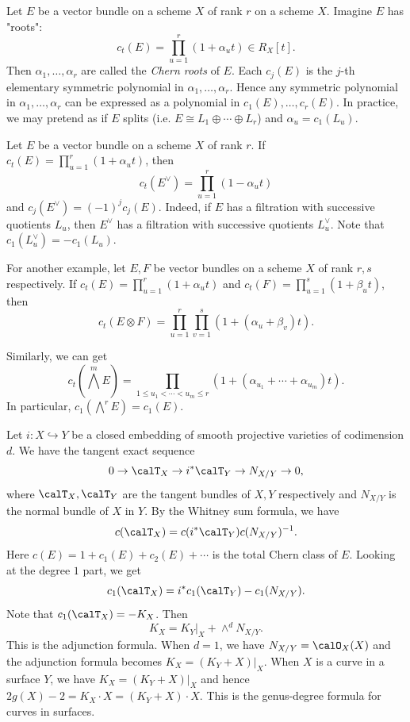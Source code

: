  Let $E$ be a vector bundle on a scheme $X$ of rank $r$ on a scheme $X$.
  Imagine $E$ has "roots":
  \[ c_t(E) = \prod_{u=1}^r (1 + \alpha_u t) \in R_X [t]. \]
  Then $\alpha_1, \dots, \alpha_r$ are called the \emph{Chern roots} of $E$.
  Each $c_j(E)$ is the $j$-th elementary symmetric polynomial in $\alpha_1, \dots, \alpha_r$.
  Hence any symmetric polynomial in $\alpha_1, \dots, \alpha_r$ can be expressed as a polynomial in $c_1(E), \dots, c_r(E)$.
  In practice, we may pretend as if $E$ splits (i.e. $E \cong L_1 \oplus \cdots \oplus L_r$) and $\alpha_u = c_1(L_u)$.

  \begin{example}
    Let $E$ be a vector bundle on a scheme $X$ of rank $r$.
    If $c_t(E) = \prod_{u=1}^r (1 + \alpha_u t)$, then 
    \[ c_t(E^\vee) = \prod_{u=1}^r (1 - \alpha_u t) \]
    and $c_j(E^\vee) = (-1)^j c_j(E)$.
    Indeed, if $E$ has a filtration with successive quotients $L_u$, then $E^\vee$ has a filtration with successive quotients $L_u^\vee$.
    Note that $c_1(L_u^\vee) = - c_1(L_u)$.

    For another example, let $E, F$ be vector bundles on a scheme $X$ of rank $r, s$ respectively.
    If $c_t(E) = \prod_{u=1}^r (1 + \alpha_u t)$ and $c_t(F) = \prod_{u=1}^{s} (1 + \beta_u t)$, then
    \[ c_t(E \otimes F) = \prod_{u=1}^r \prod_{v=1}^s (1 + (\alpha_u + \beta_v) t). \]

    Similarly, we can get
    \[ c_t(\bigwedge^m E) = \prod_{1 \leq u_1 < \cdots < u_m \leq r} (1 + (\alpha_{u_1} + \cdots + \alpha_{u_m}) t). \]
    In particular, $c_1(\bigwedge^r E) = c_1(E)$.
  \end{example}

  \begin{example}
    Let $i: X \hookrightarrow Y$ be a closed embedding of smooth projective varieties of codimension $d$.
    We have the tangent exact sequence
    \[ 0 \to \calT_X \to i^* \calT_Y \to N_{X/Y} \to 0, \]
    where $\calT_X, \calT_Y$ are the tangent bundles of $X, Y$ respectively and $N_{X/Y}$ is the normal bundle of $X$ in $Y$.
    By the Whitney sum formula, we have
    \[ c(\calT_X) = c(i^* \calT_Y) c(N_{X/Y})^{-1}. \]
    Here $c(E) = 1 + c_1(E) + c_2(E) + \cdots$ is the total Chern class of $E$.
    Looking at the degree $1$ part, we get
    \[ c_1(\calT_X) = i^* c_1(\calT_Y) - c_1(N_{X/Y}). \]
    Note that $c_1(\calT_X) = - K_X$.
    Then 
    \[ K_X = K_Y|_X + \wedge^d N_{X/Y}. \]
    This is the adjunction formula.
    When $d = 1$, we have $N_{X/Y} = \calO_X(X)$ and the adjunction formula becomes $K_X = (K_Y + X)|_X$.
    When $X$ is a curve in a surface $Y$, we have $K_X = (K_Y + X)|_X$ and hence $2g(X) - 2 = K_X \cdot X = (K_Y + X) \cdot X$.
    This is the genus-degree formula for curves in surfaces.
  \end{example}

